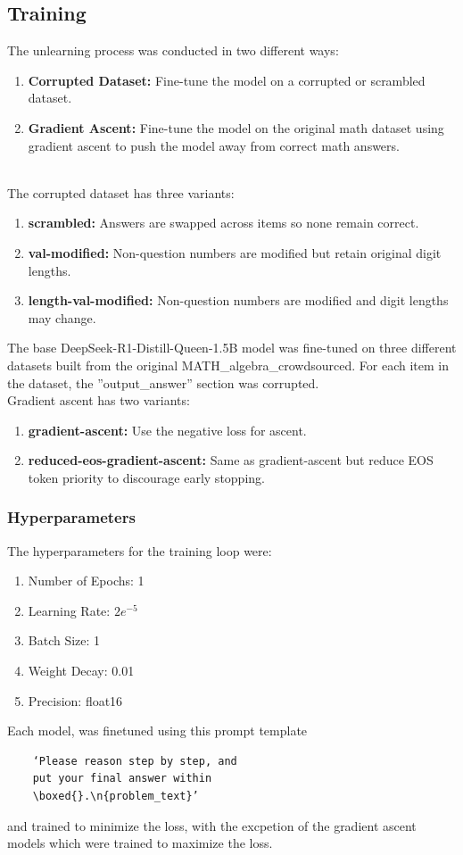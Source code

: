 \documentclass[10.5pt]{article}
\begin{document}
\subsection{Training}
The unlearning process was conducted in two different ways:
\begin{enumerate}
    \item \textbf{Corrupted Dataset:} Fine-tune the model on a corrupted or scrambled dataset.
    \item \textbf{Gradient Ascent:} Fine-tune the model on the original math dataset using gradient ascent to push the model away from correct math answers.
\end{enumerate}
\\
The corrupted dataset has three variants:
\begin{enumerate}
    \item \textbf{scrambled:} Answers are swapped across items so none remain correct.
    \item \textbf{val-modified:} Non-question numbers are modified but retain original digit lengths.
    \item \textbf{length-val-modified:} Non-question numbers are modified and digit lengths may change.
\end{enumerate}
The base DeepSeek-R1-Distill-Queen-1.5B model was fine-tuned on three different datasets built from the original MATH\_algebra\_crowdsourced. For each item in the dataset, the ''output\_answer'' section was corrupted.
\\
Gradient ascent has two variants:
\begin{enumerate}
    \item \textbf{gradient-ascent:} Use the negative loss for ascent.
    \item \textbf{reduced-eos-gradient-ascent:} Same as gradient-ascent but reduce EOS token priority to discourage early stopping.
\end{enumerate}
\subsubsection{Hyperparameters}
The hyperparameters for the training loop were:
\begin{enumerate}
    \item Number of Epochs: 1
    \item Learning Rate: $2e^{-5}$
    \item Batch Size: 1
    \item Weight Decay: 0.01
    \item Precision: float16
\end{enumerate}
Each model, was finetuned using this prompt template\begin{verbatim}
    ‘Please reason step by step, and 
    put your final answer within 
    \boxed{}.\n{problem_text}’
\end{verbatim} 
and trained to minimize the loss, with the excpetion of the gradient ascent models which were trained to maximize the loss.
\end{document}
